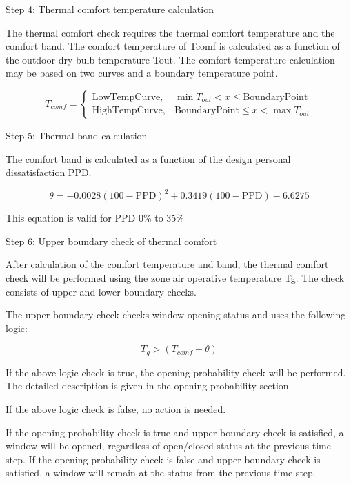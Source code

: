Step 4: Thermal comfort temperature calculation

The thermal comfort check requires the thermal comfort temperature and the comfort band. The comfort temperature of Tcomf is calculated as a function of the outdoor dry-bulb temperature Tout. The comfort temperature calculation may be based on two curves and a boundary temperature point.

\begin{equation}
T_{comf} = \left\{ \begin{array}{ll} \mathrm{Low Temp Curve,} & \min T_{out} < x \leq \mathrm{Boundary Point} \\ \mathrm{High Temp Curve,} & \mathrm{Boundary Point} \leq x < \max T_{out}  \end{array}\right.
\end{equation}

Step 5: Thermal band calculation

The comfort band is calculated as a function of the design personal dissatisfaction PPD.

\begin{equation}
\theta = -0.0028 \left(100-\mathrm{PPD}\right)^2 + 0.3419 \left(100-\mathrm{PPD}\right) - 6.6275
\end{equation}

This equation is valid for PPD 0\% to 35\%

Step 6: Upper boundary check of thermal comfort

After calculation of the comfort temperature and band, the thermal comfort check will be performed using the zone air operative temperature Tg. The check consists of upper and lower boundary checks.

The upper boundary check checks window opening status and uses the following logic:

\begin{equation}
T_g > \left(T_{comf} + \theta\right)
\end{equation}

If the above logic check is true, the opening probability check will be performed. The detailed description is given in the opening probability section.

If the above logic check is false, no action is needed.

If the opening probability check is true and upper boundary check is satisfied, a window will be opened, regardless of open/closed status at the previous time step. If the opening probability check is false and upper boundary check is satisfied, a window will remain at the status from the previous time step.

